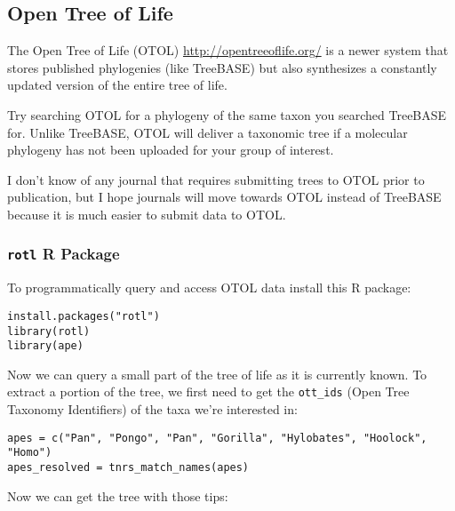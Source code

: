 \documentclass[11pt]{article}
\begin{document}
%


\subsection{Open Tree of Life}

The Open Tree of Life (OTOL) \url{http://opentreeoflife.org/}
is a newer system that stores published phylogenies (like TreeBASE)
but also synthesizes a constantly updated version of the entire tree of life.

Try searching OTOL for a phylogeny of the same taxon you searched TreeBASE for.
Unlike TreeBASE, OTOL will deliver a taxonomic tree if a molecular phylogeny 
has not been uploaded for your group of interest.

I don't know of any journal that requires submitting trees to OTOL
prior to publication, but I hope journals will move towards OTOL instead
of TreeBASE because it is much easier to submit data to OTOL.

\subsubsection{\texttt{rotl} R Package}

To programmatically query and access OTOL data install this R package:

\begin{verbatim}
install.packages("rotl")
library(rotl)
library(ape)
\end{verbatim}

Now we can query a small part of the tree of life as it is currently known.
To extract a portion of the tree, we first need to
get the \texttt{ott\_ids} (Open Tree Taxonomy Identifiers)
of the taxa we're interested in:

\begin{verbatim}
apes = c("Pan", "Pongo", "Pan", "Gorilla", "Hylobates", "Hoolock", "Homo")
apes_resolved = tnrs_match_names(apes)
\end{verbatim}

Now we can get the tree with those tips:
\end{document}
